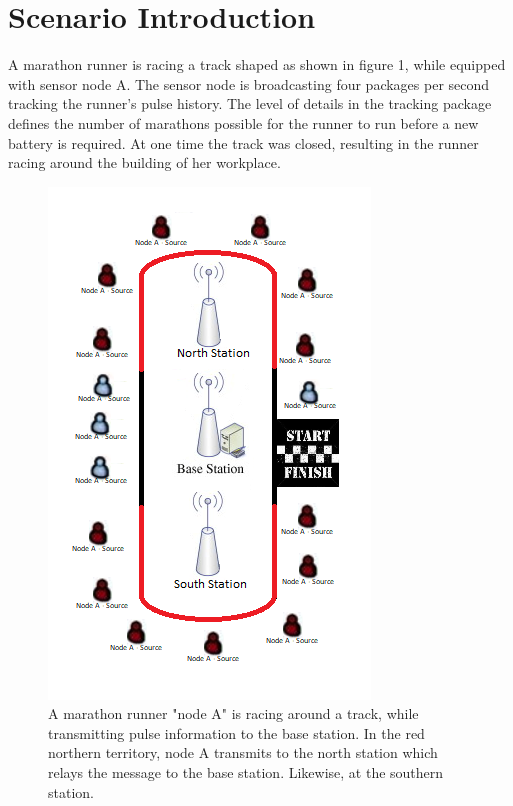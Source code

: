 \section{Scenario Introduction}\label{introduction:scenario}
A marathon runner is racing a track shaped as shown in figure 1, while equipped with sensor node A. The sensor node is broadcasting four packages per second tracking the runner’s pulse history. The level of details in the tracking package defines the number of marathons possible for the runner to run before a new battery is required. At one time the track was closed, resulting in the runner racing around the building of her workplace.


\begin{figure}[h]
	\centering
	\includegraphics[width=0.8\linewidth]{introduction/scenario/fig/scenarioIntroduction.png}
	\caption{A marathon runner "node A" is racing around a track, while transmitting pulse information to the base station. In the red northern territory, node A transmits to the north station which relays the message to the base station. Likewise, at the southern station.}
	\label{fig:scenarioIntroduction}
\end{figure}


